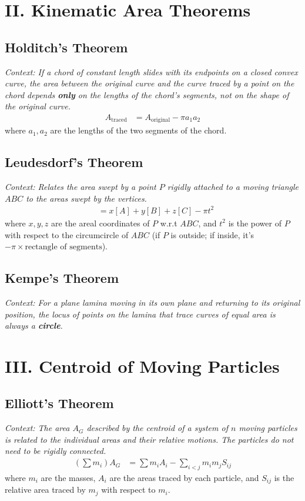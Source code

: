 \documentclass[11pt, a4paper]{article}
\begin{document}
\section*{\color{primary} II. Kinematic Area Theorems}

\subsection*{\color{secondary} Holditch's Theorem}
\textit{\small Context: If a chord of constant length slides with its endpoints on a closed convex curve, the area between the original curve and the curve traced by a point on the chord depends \textbf{only} on the lengths of the chord's segments, not on the shape of the original curve.}
\begin{align*}
    A_{\text{traced}} &= A_{\text{original}} - \pi a_1 a_2
\end{align*}
where $a_1, a_2$ are the lengths of the two segments of the chord.

\subsection*{\color{secondary} Leudesdorf's Theorem}
\textit{\small Context: Relates the area swept by a point $P$ rigidly attached to a moving triangle $ABC$ to the areas swept by the vertices.}
\begin{align*}
    [P] &= x[A] + y[B] + z[C] - \pi t^2
\end{align*}
where $x,y,z$ are the areal coordinates of $P$ w.r.t $ABC$, and $t^2$ is the power of $P$ with respect to the circumcircle of $ABC$ (if $P$ is outside; if inside, it's $-\pi \times \text{rectangle of segments}$).

\subsection*{\color{secondary} Kempe's Theorem}
\textit{\small Context: For a plane lamina moving in its own plane and returning to its original position, the locus of points on the lamina that trace curves of equal area is always a \textbf{circle}.}


\section*{\color{primary} III. Centroid of Moving Particles}

\subsection*{\color{secondary} Elliott's Theorem}
\textit{\small Context: The area $A_G$ described by the centroid of a system of $n$ moving particles is related to the individual areas and their relative motions. The particles do not need to be rigidly connected.}
\begin{align*}
    \left(\sum m_i\right) A_G &= \sum m_i A_i - \sum_{i<j} m_i m_j S_{ij}
\end{align*}
where $m_i$ are the masses, $A_i$ are the areas traced by each particle, and $S_{ij}$ is the relative area traced by $m_j$ with respect to $m_i$.
\end{document}
